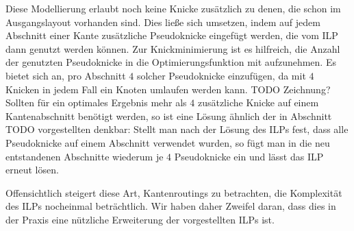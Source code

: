 Diese Modellierung erlaubt noch keine Knicke zusätzlich zu denen, die schon im Ausgangslayout vorhanden sind. Dies ließe sich umsetzen, indem auf jedem Abschnitt einer Kante zusätzliche Pseudoknicke eingefügt werden, die vom ILP dann genutzt werden können. Zur Knickminimierung ist es hilfreich, die Anzahl der genutzten Pseudoknicke in die Optimierungsfunktion mit aufzunehmen. Es bietet sich an, pro Abschnitt $4$ solcher Pseudoknicke einzufügen, da mit $4$ Knicken in jedem Fall ein Knoten umlaufen werden kann. TODO Zeichnung? Sollten für ein optimales Ergebnis mehr als $4$ zusätzliche Knicke auf einem Kantenabschnitt benötigt werden, so ist eine Lösung ähnlich der in Abschnitt TODO vorgestellten denkbar: Stellt man nach der Lösung des ILPs fest, dass alle Pseudoknicke auf einem Abschnitt verwendet wurden, so fügt man in die neu entstandenen Abschnitte wiederum je $4$ Pseudoknicke ein und lässt das ILP erneut lösen.

Offensichtlich steigert diese Art, Kantenroutings zu betrachten, die Komplexität des ILPs nocheinmal beträchtlich. Wir haben daher Zweifel daran, dass dies in der Praxis eine nützliche Erweiterung der vorgestellten ILPs ist.
